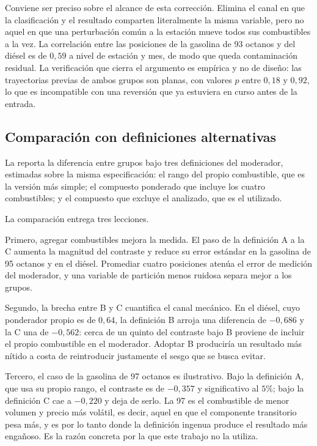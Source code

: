 Conviene ser preciso sobre el alcance de esta corrección. Elimina el canal en
que la clasificación y el resultado comparten literalmente la misma variable,
pero no aquel en que una perturbación común a la estación mueve todos sus
combustibles a la vez. La correlación entre las posiciones de la gasolina de 93
octanos y del diésel es de $0{,}59$ a nivel de estación y mes, de modo que queda
contaminación residual. La verificación que cierra el argumento es empírica y no
de diseño: las trayectorias previas de ambos grupos son planas, con valores $p$
entre $0{,}18$ y $0{,}92$, lo que es incompatible con una reversión que ya
estuviera en curso antes de la entrada.

\subsection{Comparación con definiciones alternativas}

La  reporta la diferencia entre grupos bajo tres
definiciones del moderador, estimadas sobre la misma especificación: el rango del
propio combustible, que es la versión más simple; el compuesto ponderado que
incluye los cuatro combustibles; y el compuesto que excluye el analizado, que es
el utilizado.

\begin{table}[H]
\centering
\caption{Diferencia entre grupos según la definición del margen previo}
\label{tab:moderador}
\end{table}

La comparación entrega tres lecciones.

Primero, agregar combustibles mejora la medida. El paso de la definición A a la
C aumenta la magnitud del contraste y reduce su error estándar en la gasolina de
95 octanos y en el diésel. Promediar cuatro posiciones atenúa el error de
medición del moderador, y una variable de partición menos ruidosa separa mejor a
los grupos.

Segundo, la brecha entre B y C cuantifica el canal mecánico. En el diésel, cuyo
ponderador propio es de $0{,}64$, la definición B arroja una diferencia de
$-0{,}686$ y la C una de $-0{,}562$: cerca de un quinto del contraste bajo B
proviene de incluir el propio combustible en el moderador. Adoptar B produciría
un resultado más nítido a costa de reintroducir justamente el sesgo que se busca
evitar.

Tercero, el caso de la gasolina de 97 octanos es ilustrativo. Bajo la definición
A, que usa su propio rango, el contraste es de $-0{,}357$ y significativo al
$5\%$; bajo la definición C cae a $-0{,}220$ y deja de serlo. La 97 es el
combustible de menor volumen y precio más volátil, es decir, aquel en que el
componente transitorio pesa más, y es por lo tanto donde la definición ingenua
produce el resultado más engañoso. Es la razón concreta por la que este trabajo
no la utiliza.
